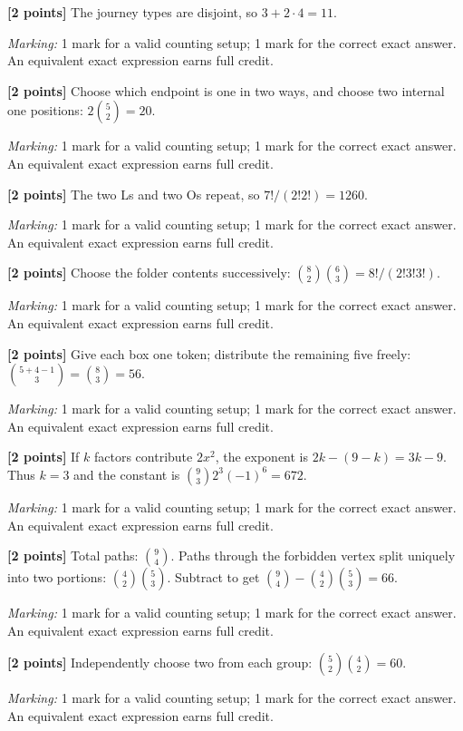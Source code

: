 \documentclass[12pt,letterpaper]{article}
\begin{document}
\begin{description}[font=\normalfont,leftmargin=1.2em,labelsep=0.4em]
\item[(a)] \textbf{[2 points]} The journey types are disjoint, so $3+2\cdot4=11$.
\par\textit{Marking:} 1 mark for a valid counting setup; 1 mark for the correct exact answer. An equivalent exact expression earns full credit.
\item[(b)] \textbf{[2 points]} Choose which endpoint is one in two ways, and choose two internal one positions: $2\binom52=20$.
\par\textit{Marking:} 1 mark for a valid counting setup; 1 mark for the correct exact answer. An equivalent exact expression earns full credit.
\item[(c)] \textbf{[2 points]} The two Ls and two Os repeat, so $7!/(2!2!)=1260$.
\par\textit{Marking:} 1 mark for a valid counting setup; 1 mark for the correct exact answer. An equivalent exact expression earns full credit.
\item[(d)] \textbf{[2 points]} Choose the folder contents successively: $\binom82\binom63=8!/(2!3!3!)$.
\par\textit{Marking:} 1 mark for a valid counting setup; 1 mark for the correct exact answer. An equivalent exact expression earns full credit.
\item[(e)] \textbf{[2 points]} Give each box one token; distribute the remaining five freely: $\binom{5+4-1}{3}=\binom83=56$.
\par\textit{Marking:} 1 mark for a valid counting setup; 1 mark for the correct exact answer. An equivalent exact expression earns full credit.
\item[(f)] \textbf{[2 points]} If $k$ factors contribute $2x^2$, the exponent is $2k-(9-k)=3k-9$. Thus $k=3$ and the constant is $\binom93 2^3(-1)^6=672$.
\par\textit{Marking:} 1 mark for a valid counting setup; 1 mark for the correct exact answer. An equivalent exact expression earns full credit.
\item[(g)] \textbf{[2 points]} Total paths: $\binom94$. Paths through the forbidden vertex split uniquely into two portions: $\binom42\binom53$. Subtract to get $\binom94-\binom42\binom53=66$.
\par\textit{Marking:} 1 mark for a valid counting setup; 1 mark for the correct exact answer. An equivalent exact expression earns full credit.
\item[(h)] \textbf{[2 points]} Independently choose two from each group: $\binom52\binom42=60$.
\par\textit{Marking:} 1 mark for a valid counting setup; 1 mark for the correct exact answer. An equivalent exact expression earns full credit.
\end{description}
\end{document}
